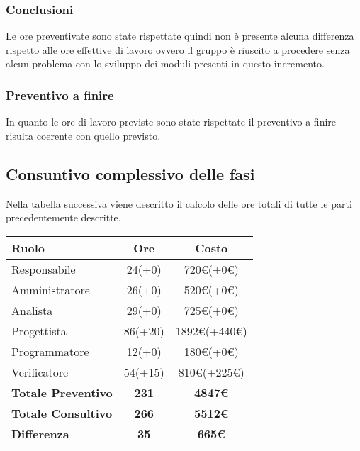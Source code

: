 {{{{{{\subsubsection{Conclusioni}
Le ore preventivate sono state rispettate quindi non è presente alcuna differenza rispetto alle ore effettive di lavoro ovvero il gruppo è riuscito a procedere senza alcun problema con lo sviluppo dei moduli presenti in questo incremento.

\subsubsection{Preventivo a finire}
In quanto le ore di lavoro previste sono state rispettate il preventivo a finire risulta coerente con quello previsto.

\subsection{Consuntivo complessivo delle fasi}\label{ConsuntivoPeriodoDiProgettazioneArchitetturaleConsuntivoComplessivoDelleFasi}

Nella tabella successiva viene descritto il calcolo delle ore totali di tutte le parti precedentemente descritte.

\quad
\def\tabularxcolumn#1{m{#1}}
{
	\begin{center}
		\renewcommand{\arraystretch}{1.4}
		\begin{tabularx}{10cm}{|X|c|c|}
			\hline
			\rowcolor{airforceblue}
			\textbf{Ruolo} & \textbf{Ore} & \textbf{Costo}\\
			\hline
			Responsabile & 24(+0) & 720\euro(+0\euro)\\
			\hline
			Amministratore & 26(+0) & 520\euro(+0\euro)\\
			\hline
			Analista & 29(+0) & 725\euro(+0\euro)\\
			\hline
			Progettista & 86(+20) & 1892\euro(+440\euro)\\
			\hline
			Programmatore & 12(+0) & 180\euro(+0\euro)\\
			\hline
			Verificatore & 54(+15) & 810\euro(+225\euro)\\
			\hline
			\textbf{Totale Preventivo} & \textbf{231} & \textbf{4847\euro}\\
			\hline
			\textbf{Totale Consultivo} & \textbf{266} & \textbf{5512\euro}\\
			\hline
			\textbf{Differenza} & \textbf{35} & \textbf{665\euro}
		\end{tabularx}
	\end{center}

}}}}}}}

